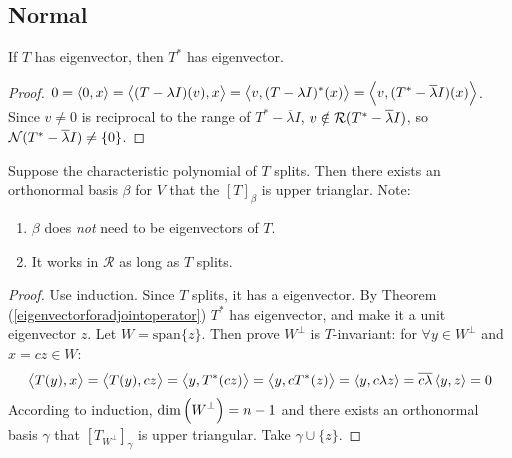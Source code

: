 \subsection{Normal}

\begin{theorem}\label{eigenvectorforadjointoperator}
    If $T$ has eigenvector, then $T^*$ has eigenvector.    
\end{theorem}
\begin{proof}
    $0 = \left\langle \displaystyle 0, x \right\rangle = \left\langle \displaystyle (T - \lambda I)(v), x \right\rangle = \left\langle \displaystyle v, (T - \lambda I)^* (x) \right\rangle = \left\langle \displaystyle v, (T^* - \overline{\lambda} I)(x) \right\rangle$. Since $v \neq 0$ is reciprocal to the range of $T^* - \overline{\lambda} I$, $v \notin \mathcal{R}(T^* - \overline{\lambda} I)$, so $\mathcal{N}(T^* - \overline{\lambda} I) \neq \{ 0 \}$.
\end{proof}

\begin{theorem}\label{schurincomplexfield}
    Suppose the characteristic polynomial of $T$ splits. Then there exists an orthonormal basis $\beta$ for $V$ that the $[T]_\beta$ is upper trianglar. Note:
    \begin{enumerate}
        \item $\beta$ does \emph{not} need to be eigenvectors of $T$.
        \item It works in $\mathcal{R}$ as long as $T$ splits.
    \end{enumerate} 
\end{theorem}
\begin{proof}
    Use induction. Since $T$ splits, it has a eigenvector. By Theorem (\ref{eigenvectorforadjointoperator}) $T^*$ has eigenvector, and make it a unit eigenvector $z$. Let $W = \text{span}\{z\}$. Then prove $W^\bot$ is $T$-invariant: for $\forall y \in W^\bot$ and $x = cz \in W$:
    \begin{equation*}
        \begin{aligned}
            \left\langle \displaystyle T(y), x \right\rangle = \left\langle \displaystyle T(y), cz \right\rangle = \left\langle \displaystyle y, T^*(cz) \right\rangle = \left\langle \displaystyle y, cT^*(z) \right\rangle = \left\langle \displaystyle y, c \lambda z \right\rangle = \overline{c\lambda} \left\langle \displaystyle y, z \right\rangle = 0
        \end{aligned}
    \end{equation*}
    According to induction, $\displaystyle \text{dim}\left( W^\bot \right) = n - 1$ and there exists an orthonormal basis $\gamma$ that $[T_{W^\bot}]_\gamma$ is upper triangular. Take $\gamma \cup \{z \}$.
\end{proof}

